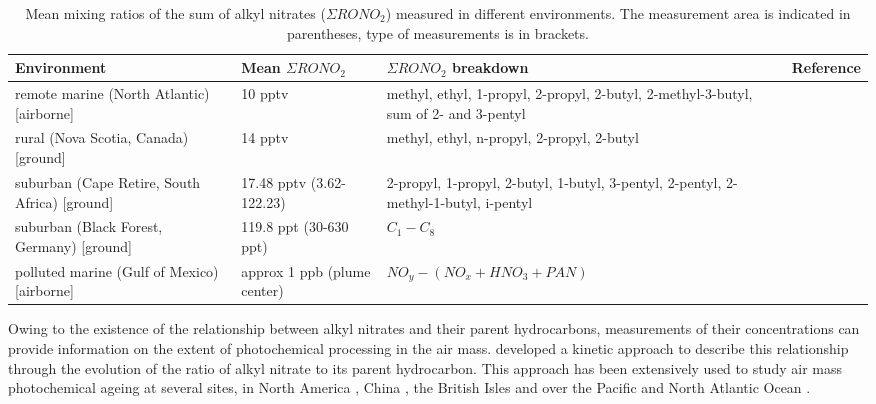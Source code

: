 \documentclass[11pt,a4paper]{article}
\begin{document}
\renewcommand{\arraystretch}{1}
\begin{table}[h!]
\caption{Mean mixing ratios of the sum of alkyl nitrates ($\Sigma RONO_2$) measured in different environments. The measurement area is indicated in parentheses, type of measurements is in brackets.}
\label{tab:ANmean} %
\begin{tabularx}{\linewidth}{P{3cm}P{2cm}P{5cm}X}
\hline
Environment     & Mean $\Sigma RONO_2$ & $\Sigma RONO_2$ breakdown & Reference \\
\hline
remote marine (North Atlantic) [airborne]   & 10 pptv    & methyl, ethyl, 1-propyl, 2-propyl, 2-butyl, 2-methyl-3-butyl, sum of 2- and 3-pentyl  & \citep{Reeves2007} \\
\hline
rural (Nova Scotia, Canada) [ground]        & 14 pptv    & methyl, ethyl, n-propyl, 2-propyl, 2-butyl  & \citep{Roberts1998} \\
\hline
suburban (Cape Retire, South Africa) [ground] & 17.48 pptv (3.62-122.23) & 2-propyl, 1-propyl, 2-butyl, 1-butyl, 3-pentyl, 2-pentyl, 2-methyl-1-butyl, i-pentyl & \citep{DeKock1994} \\
\hline
suburban (Black Forest, Germany) [ground]   & 119.8 ppt (30-630 ppt) & $C_1-C_8$ & \citep{Flocke1998} \\
\hline
polluted marine (Gulf of Mexico) [airborne] & approx 1 ppb (plume center)& $NO_y-(NO_x+HNO_3+PAN)$ & \citep{Neuman2012} \\
\hline
\end{tabularx}
\end{table}

Owing to the existence of the relationship between alkyl nitrates and their parent hydrocarbons, measurements of their concentrations can provide information on the extent of photochemical processing in the air mass. \cite{Bertman1995} developed a kinetic approach to describe this relationship through the evolution of the ratio of alkyl nitrate to its parent hydrocarbon. This approach has been extensively used to study air mass photochemical ageing at several sites, in North America \citep{Bertman1995,Roberts1998}, China \citep{Simpson2006}, the British Isles \citep{Worton2010} and over the Pacific \citep{Simpson2003} and North Atlantic Ocean \citep{Reeves2007,Stroud2001}.
\end{document}
